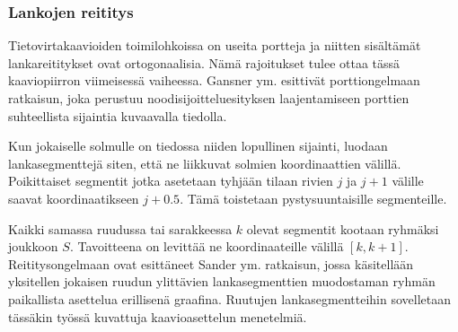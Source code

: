 \documentclass[finnish,12pt]{article}
\begin{document}
		\subsubsection{Lankojen reititys}

Tietovirtakaavioiden toimilohkoissa on useita portteja ja niitten sisältämät lankareititykset ovat ortogonaalisia.
Nämä rajoitukset tulee ottaa tässä kaaviopiirron viimeisessä vaiheessa.
Gansner ym. esittivät porttiongelmaan ratkaisun, joka perustuu noodisijoitteluesityksen laajentamiseen porttien suhteellista sijaintia kuvaavalla tiedolla.\cite{RefWorks:28}

Kun jokaiselle solmulle on tiedossa niiden lopullinen sijainti, luodaan lankasegmenttejä siten, että ne liikkuvat solmien koordinaattien välillä.
Poikittaiset segmentit jotka asetetaan tyhjään tilaan rivien $j$ ja $j+1$ välille saavat koordinaatikseen $j+0.5$.
Tämä toistetaan pystysuuntaisille segmenteille.

Kaikki samassa ruudussa tai sarakkeessa $k$ olevat segmentit kootaan ryhmäksi joukkoon $S$.
Tavoitteena on levittää ne koordinaateille välillä $[k, k+1]$.
Reititysongelmaan ovat esittäneet Sander ym. ratkaisun, jossa käsitellään yksitellen jokaisen ruudun ylittävien lankasegmenttien muodostaman ryhmän paikallista asettelua erillisenä graafina. \cite{RefWorks:17}
Ruutujen lankasegmentteihin sovelletaan tässäkin työssä kuvattuja kaavioasettelun menetelmiä.





\end{document}
